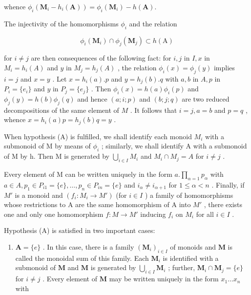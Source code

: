 whence \(\phi_{i}(\mathbf{M}_{i} - h_{i}(\mathbf{A})) = \phi_{i}(\mathbf{M}_{i}) - h(\mathbf{A}).\)

The injectivity of the homomorphisms \(\phi_{i}\) and the relation

\[
\phi_ {i} (\mathbf {M} _ {i}) \cap \phi_ {j} (\mathbf {M} _ {j}) \subset h (\mathrm{A})
\]

for \(i \neq j\) are then consequences of the following fact: for \(i, j\) in \(I, x\) in \(M_i = h_i(A)\) and \(y\) in \(M_j = h_j(A)\) , the relation \(\phi_i(x) = \phi_j(y)\) implies \(i = j\) and \(x = y\) . Let \(x = h_i(a).p\) and \(y = h_j(b).q\) with \(a, b\) in \(A, p\) in \(P_i = \{e_i\}\) and \(y\) in \(P_j = \{e_j\}\) . Then \(\phi_i(x) = h(a)\phi_i(p)\) and \(\phi_j(y) = h(b)\phi_j(q)\) and hence \((a; i; p)\) and \((b; j; q)\) are two reduced decompositions of the same element of \(M\) . It follows that \(i = j, a = b\) and \(p = q\) , whence \(x = h_i(a)p = h_j(b)q = y\) .

When hypothesis (A) is fulfilled, we shall identify each monoid \(M_{i}\) with a submonoid of M by means of \(\phi_{i}\) ; similarly, we shall identify A with a submonoid of M by h. Then M is generated by \(\bigcup_{i\in I}M_{i}\) and \(M_{i}\cap M_{j}=A\) for \(i\neq j\) .

Every element of M can be written uniquely in the form \(a.\prod_{\alpha=1}p_{\alpha}\) with \(a\in A, p_{1}\in P_{i1}=\{e\},\ldots,p_{n}\in P_{in}=\{e\}\) and \(i_{\alpha}\neq i_{\alpha+1}\) for \(1\leqslant\alpha<n\) . Finally, if \(M'\) is a monoid and \((f_{i}:M_{i}\to M')\) (for \(i\in I\) ) a family of homomorphisms whose restrictions to A are the same homomorphism of A into \(M'\) , there exists one and only one homomorphism \(f:M\to M'\) inducing \(f_{i}\) on \(M_{i}\) for all \(i\in I\) .

Hypothesis (A) is satisfied in two important cases:

\begin{enumerate}
\def\labelenumi{(\alph{enumi})}
\tightlist
\item
  \(\mathbf{A} = \{e\}\) . In this case, there is a family \((\mathbf{M}_i)_{i\in I}\) of monoids and \(\mathbf{M}\) is called the monoidal sum of this family. Each \(\mathbf{M}_i\) is identified with a submonoid of \(\mathbf{M}\) and \(\mathbf{M}\) is generated by \(\bigcup_{i\in I}\mathbf{M}_i\) ; further, \(\mathbf{M}_i\cap \mathbf{M}_j = \{e\}\) for \(i\neq j\) . Every element of \(\mathbf{M}\) may be written uniquely in the form \(x_{1}\ldots x_{n}\) with
\end{enumerate}

